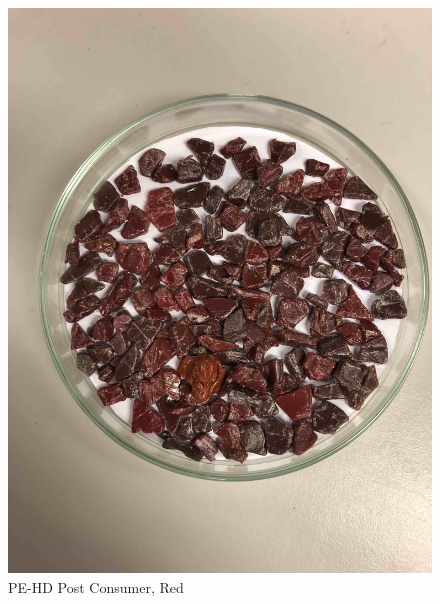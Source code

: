 \begin{appendices}
\begin{figure}
    \centering
    \includegraphics[width = 12cm]{Images/appendix/PE-Regrind-(Post-Consumer)-red.jpg}
    \caption{PE-HD Post Consumer, Red}
    \label{fig:pehd-red}
\end{figure}


\end{appendices}
